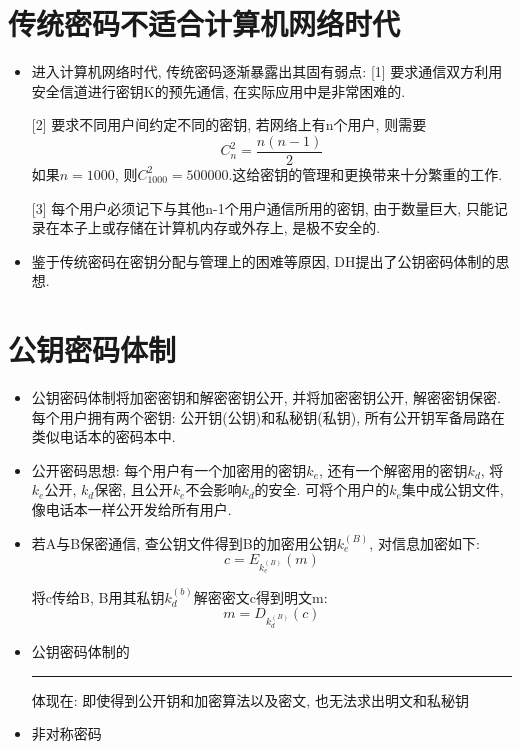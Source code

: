 \documentclass[UTF8]{ctexart}
\newcommand\hl{\bgroup\markoverwith
  {\textcolor{yellow}{\rule[-.5ex]{2pt}{2.5ex}}}\ULon}
\begin{document}
    \section{传统密码不适合计算机网络时代}
    \begin{itemize}
        \renewcommand{\labelitemi}{\scriptsize$\blacksquare$}
        \item 进入计算机网络时代, 传统密码逐渐暴露出其固有弱点:
        [1] 要求通信双方利用安全信道进行密钥K的预先通信, 在实际应用中是非常困难的.

        [2] 要求不同用户间约定不同的密钥, 若网络上有n个用户, 则需要
        $$C_n^2=\frac{n(n-1)}{2}$$
        如果$n=1000$, 则$C_{1000}^2=500000$.这给密钥的管理和更换带来十分繁重的工作.

        [3] 每个用户必须记下与其他n-1个用户通信所用的密钥, 由于数量巨大, 只能记录在本子上或存储在计算机内存或外存上, 是极不安全的.
        \item 鉴于传统密码在密钥分配与管理上的困难等原因, DH提出了公钥密码体制的思想.
    \end{itemize}

    \section{公钥密码体制}
    \begin{itemize}
        \renewcommand{\labelitemi}{\scriptsize$\blacksquare$}
        \item 公钥密码体制将加密密钥和解密密钥公开, 并将加密密钥公开, 解密密钥保密. 每个用户拥有两个密钥: 公开钥(公钥)和私秘钥(私钥), 所有公开钥军备局路在类似电话本的密码本中.
        \item 公开密码思想: 每个用户有一个加密用的密钥$k_e$, 还有一个解密用的密钥$k_d$, 将$k_e$公开, $k_d$保密, 且公开$k_e$不会影响$k_d$的安全. 可将个用户的$k_e$集中成公钥文件, 像电话本一样公开发给所有用户.
        \item 若A与B保密通信, 查公钥文件得到B的加密用公钥$k^{(B)}_e$, 对信息加密如下:
        $$c=E_{k^{(B)}_e}(m)$$

        将c传给B, B用其私钥$k^{(b)}_d$解密密文c得到明文m:
        $$m=D_{k^{(B)}_d}(c)$$

        \item 公钥密码体制的\hl{安全性}体现在: 即使得到公开钥和加密算法以及密文, 也无法求出明文和私秘钥
        \item 非对称密码
    \end{itemize}
\end{document}
